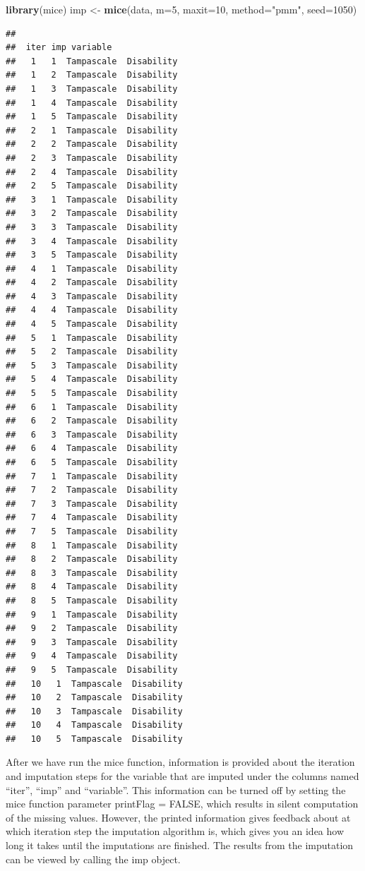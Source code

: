 \documentclass[]{book}
\newenvironment{Shaded}{\begin{snugshade}}{\end{snugshade}}
\newcommand{\KeywordTok}[1]{\textcolor[rgb]{0.13,0.29,0.53}{\textbf{#1}}}
\newcommand{\DataTypeTok}[1]{\textcolor[rgb]{0.13,0.29,0.53}{#1}}
\newcommand{\DecValTok}[1]{\textcolor[rgb]{0.00,0.00,0.81}{#1}}
\newcommand{\StringTok}[1]{\textcolor[rgb]{0.31,0.60,0.02}{#1}}
\newcommand{\NormalTok}[1]{#1}
\begin{document}
\begin{Shaded}
\begin{Highlighting}[]
\KeywordTok{library}\NormalTok{(mice)}
\NormalTok{imp <-}\StringTok{ }\KeywordTok{mice}\NormalTok{(data, }\DataTypeTok{m=}\DecValTok{5}\NormalTok{, }\DataTypeTok{maxit=}\DecValTok{10}\NormalTok{, }\DataTypeTok{method=}\StringTok{"pmm"}\NormalTok{, }\DataTypeTok{seed=}\DecValTok{1050}\NormalTok{)}
\end{Highlighting}
\end{Shaded}

\begin{verbatim}
## 
##  iter imp variable
##   1   1  Tampascale  Disability
##   1   2  Tampascale  Disability
##   1   3  Tampascale  Disability
##   1   4  Tampascale  Disability
##   1   5  Tampascale  Disability
##   2   1  Tampascale  Disability
##   2   2  Tampascale  Disability
##   2   3  Tampascale  Disability
##   2   4  Tampascale  Disability
##   2   5  Tampascale  Disability
##   3   1  Tampascale  Disability
##   3   2  Tampascale  Disability
##   3   3  Tampascale  Disability
##   3   4  Tampascale  Disability
##   3   5  Tampascale  Disability
##   4   1  Tampascale  Disability
##   4   2  Tampascale  Disability
##   4   3  Tampascale  Disability
##   4   4  Tampascale  Disability
##   4   5  Tampascale  Disability
##   5   1  Tampascale  Disability
##   5   2  Tampascale  Disability
##   5   3  Tampascale  Disability
##   5   4  Tampascale  Disability
##   5   5  Tampascale  Disability
##   6   1  Tampascale  Disability
##   6   2  Tampascale  Disability
##   6   3  Tampascale  Disability
##   6   4  Tampascale  Disability
##   6   5  Tampascale  Disability
##   7   1  Tampascale  Disability
##   7   2  Tampascale  Disability
##   7   3  Tampascale  Disability
##   7   4  Tampascale  Disability
##   7   5  Tampascale  Disability
##   8   1  Tampascale  Disability
##   8   2  Tampascale  Disability
##   8   3  Tampascale  Disability
##   8   4  Tampascale  Disability
##   8   5  Tampascale  Disability
##   9   1  Tampascale  Disability
##   9   2  Tampascale  Disability
##   9   3  Tampascale  Disability
##   9   4  Tampascale  Disability
##   9   5  Tampascale  Disability
##   10   1  Tampascale  Disability
##   10   2  Tampascale  Disability
##   10   3  Tampascale  Disability
##   10   4  Tampascale  Disability
##   10   5  Tampascale  Disability
\end{verbatim}

After we have run the mice function, information is provided about the
iteration and imputation steps for the variable that are imputed under
the columns named ``iter'', ``imp'' and ``variable''. This information
can be turned off by setting the mice function parameter printFlag =
FALSE, which results in silent computation of the missing values.
However, the printed information gives feedback about at which iteration
step the imputation algorithm is, which gives you an idea how long it
takes until the imputations are finished. The results from the
imputation can be viewed by calling the imp object.
\end{document}
